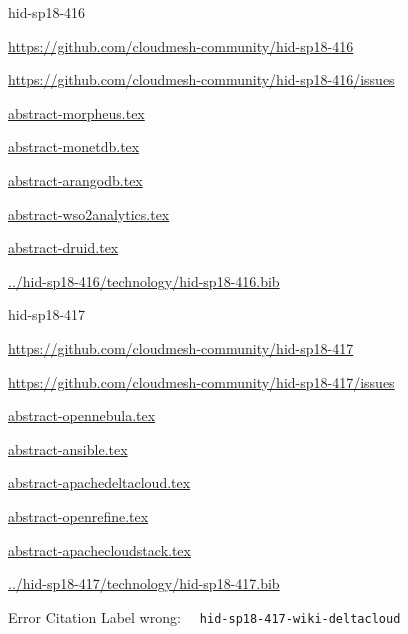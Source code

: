 \begin{IU}

hid-sp18-416

\url{https://github.com/cloudmesh-community/hid-sp18-416}

\url{https://github.com/cloudmesh-community/hid-sp18-416/issues}

\href{https://github.com/cloudmesh-community/hid-sp18-416/blob/master//technology/abstract-morpheus.tex}{abstract-morpheus.tex}

\href{https://github.com/cloudmesh-community/hid-sp18-416/blob/master//technology/abstract-monetdb.tex}{abstract-monetdb.tex}

\href{https://github.com/cloudmesh-community/hid-sp18-416/blob/master//technology/abstract-arangodb.tex}{abstract-arangodb.tex}

\href{https://github.com/cloudmesh-community/hid-sp18-416/blob/master//technology/abstract-wso2analytics.tex}{abstract-wso2analytics.tex}

\href{https://github.com/cloudmesh-community/hid-sp18-416/blob/master//technology/abstract-druid.tex}{abstract-druid.tex}

\href{https://github.com/cloudmesh-community/hid-sp18-416/blob/master//technology/hid-sp18-416.bib}{../hid-sp18-416/technology/hid-sp18-416.bib}

\end{IU}


\begin{IU}

hid-sp18-417

\url{https://github.com/cloudmesh-community/hid-sp18-417}

\url{https://github.com/cloudmesh-community/hid-sp18-417/issues}

\href{https://github.com/cloudmesh-community/hid-sp18-417/blob/master//technology/abstract-opennebula.tex}{abstract-opennebula.tex}

\href{https://github.com/cloudmesh-community/hid-sp18-417/blob/master//technology/abstract-ansible.tex}{abstract-ansible.tex}

\href{https://github.com/cloudmesh-community/hid-sp18-417/blob/master//technology/abstract-apachedeltacloud.tex}{abstract-apachedeltacloud.tex}

\href{https://github.com/cloudmesh-community/hid-sp18-417/blob/master//technology/abstract-openrefine.tex}{abstract-openrefine.tex}

\href{https://github.com/cloudmesh-community/hid-sp18-417/blob/master//technology/abstract-apachecloudstack.tex}{abstract-apachecloudstack.tex}

\href{https://github.com/cloudmesh-community/hid-sp18-417/blob/master//technology/hid-sp18-417.bib}{../hid-sp18-417/technology/hid-sp18-417.bib}

 Error Citation Label wrong: \verb|  hid-sp18-417-wiki-deltacloud |

\end{IU}


